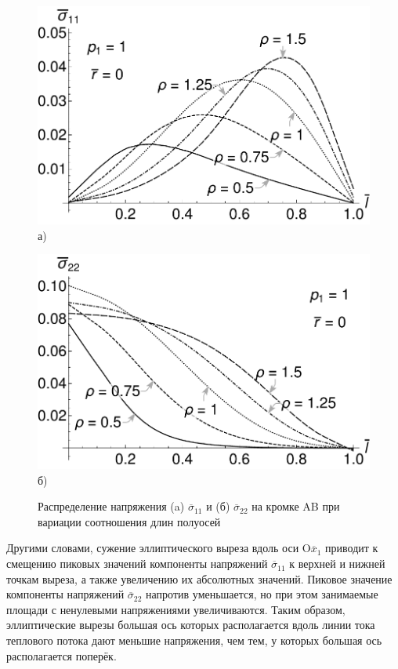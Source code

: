 \begin{figure}[ht]
    \begin{minipage}[b][][b]{0.49\linewidth}\centering
        \includegraphics[width=\linewidth]{pics/ThermalKirshSigma11Local.pdf} \\ а)
    \end{minipage}
    \hfill
    \begin{minipage}[b][][b]{0.49\linewidth}\centering
        \includegraphics[width=\linewidth]{pics/ThermalKirshSigma22Local.pdf} \\ б)
    \end{minipage}
    \caption{Распределение напряжения (a) $\overline{\sigma}_{11}$ и (б) $\overline{\sigma}_{22}$ на кромке AB при вариации соотношения длин полуосей}
    \label{fig:ThermalKirshLocal}
\end{figure}

Другими словами, сужение эллиптического выреза вдоль оси O$\overline{x}_1$ приводит к смещению пиковых значений компоненты напряжений $\overline{\sigma}_{11}$ к верхней и нижней точкам выреза, а также увеличению их абсолютных значений. Пиковое значение компоненты напряжений $\overline{\sigma}_{22}$ напротив уменьшается, но при этом занимаемые площади с ненулевыми напряжениями увеличиваются. Таким образом, эллиптические вырезы большая ось которых располагается вдоль линии тока теплового потока дают меньшие напряжения, чем тем, у которых большая ось располагается поперёк.

